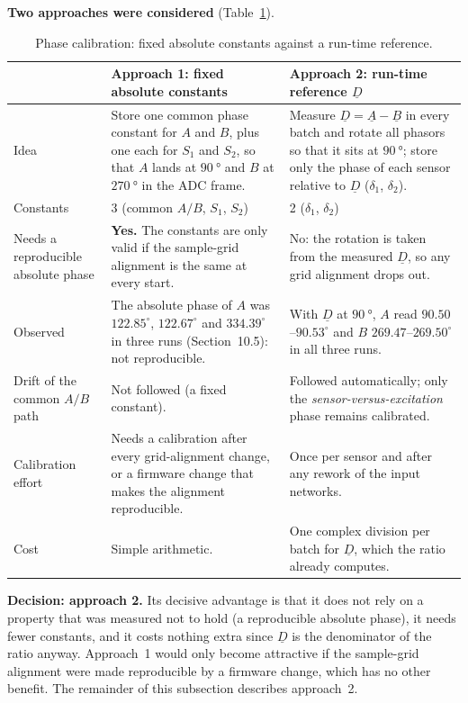 \documentclass[11pt,a4paper]{article}
\begin{document}
\textbf{Two approaches were considered} (Table~\ref{tab:approaches}).
\begin{table}[ht]
\centering
\small
\begin{tabular}{@{}p{}p{}p{}@{}}
\toprule
 & Approach 1: fixed absolute constants & Approach 2: run-time reference $\underline{D}$ \\
\midrule
Idea & Store one common phase constant for $A$ and $B$, plus one each for
  $S_1$ and $S_2$, so that $A$ lands at $\SI{90}{\degree}$ and $B$ at
  $\SI{270}{\degree}$ in the ADC frame.
& Measure $\underline{D}=\underline{A}-\underline{B}$ in every batch and rotate
  all phasors so that it sits at $\SI{90}{\degree}$; store only the phase of
  each sensor relative to $\underline{D}$ ($\delta_1$, $\delta_2$). \\
Constants & 3 (common $A/B$, $S_1$, $S_2$) & 2 ($\delta_1$, $\delta_2$) \\
Needs a reproducible absolute phase & \textbf{Yes.}  The constants are only valid if the
  sample-grid alignment is the same at every start.
& No: the rotation is taken from the measured $\underline{D}$, so any grid
  alignment drops out. \\
Observed & The absolute phase of $A$ was $122.85^{\circ}$, $122.67^{\circ}$ and
  $334.39^{\circ}$ in three runs (Section~10.5): not reproducible.
& With $\underline{D}$ at $\SI{90}{\degree}$, $A$ read $90.50$--$90.53^{\circ}$ and $B$
  $269.47$--$269.50^{\circ}$ in all three runs. \\
Drift of the common $A/B$ path & Not followed (a fixed constant).
& Followed automatically; only the \emph{sensor-versus-excitation} phase remains
  calibrated. \\
Calibration effort & Needs a calibration after every grid-alignment change, or a
  firmware change that makes the alignment reproducible.
& Once per sensor and after any rework of the input networks. \\
Cost & Simple arithmetic.
& One complex division per batch for $\underline{D}$, which the ratio already
  computes. \\
\bottomrule
\end{tabular}
\caption{Phase calibration: fixed absolute constants against a run-time reference.}
\label{tab:approaches}
\end{table}
\textbf{Decision: approach 2.}  Its decisive advantage is that it does not rely on
a property that was measured not to hold (a reproducible absolute phase), it needs
fewer constants, and it costs nothing extra since $\underline{D}$ is the
denominator of the ratio anyway.  Approach~1 would only become attractive if the
sample-grid alignment were made reproducible by a firmware change, which has no
other benefit.  The remainder of this subsection describes approach~2.
\end{document}

